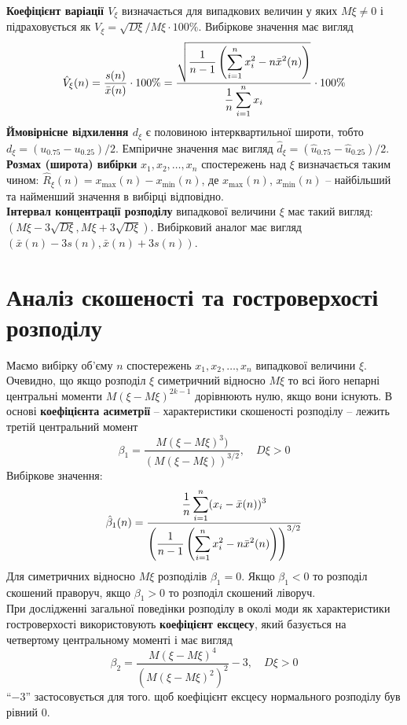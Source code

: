 \textbf{Коефіцієнт варіації $V_\xi$} визначається для випадкових величин у яких $M \xi \ne 0$ і підраховується як $V_\xi = \sqrt{D\xi} / M \xi \cdot 100\%$. Вибіркове значення має вигляд 
\[ \hat{V}_\xi(n) = \dfrac{s(n)}{\bar{x}(n)} \cdot 100\% = \dfrac{\sqrt{\dfrac{1}{n-1} \left(\displaystyle\sum\limits_{i=1}^n x_i^2 - n \bar{x}^2(n)\right)}}{\dfrac{1}{n} \displaystyle\sum\limits_{i=1}^n x_i} \cdot 100\% \]
\textbf{Ймовірнісне відхилення $d_\xi$} є половиною інтерквартильної широти, тобто $d_\xi = (u_{0.75} - u_{0.25}) / 2$. Емпіричне значення має вигляд $\hat{d}_\xi = (\hat{u}_{0.75} - \hat{u}_{0.25}) / 2$. \\

\textbf{Розмах (широта) вибірки} $x_1, x_2, \ldots, x_n$ спостережень над $\xi$ визначається таким чином: $\hat{R}_\xi(n) = x_{\max}(n) - x_{\min}(n)$, де $x_{\max}(n)$, $x_{\min}(n)$ -- найбільший та найменший значення в вибірці відповідно. \\

\textbf{Інтервал концентрації розподілу} випадкової величини $\xi$ має такий вигляд: $(M \xi - 3 \sqrt{D \xi}, M \xi + 3 \sqrt{D \xi})$. Вибірковий аналог має вигляд $(\bar{x}(n) - 3 s(n), \bar{x}(n) + 3 s(n))$.

\section{Аналіз скошеності та гостроверхості розподілу}

Маємо вибірку об'єму $n$ спостережень $x_1, x_2, \ldots, x_n$ випадкової величини $\xi$. \\

Очевидно, що якщо розподіл $\xi$ симетричний відносно $M \xi$ то всі його непарні центральні моменти $M(\xi - M \xi)^{2k-1}$ дорівнюють нулю, якщо вони існують. В основі \textbf{коефіцієнта асиметрії} -- характеристики скошеності розподілу -- лежить третій центральний момент
\[ \beta_1 = \dfrac{M(\xi - M\xi)^3)}{(M(\xi - M \xi))^{3/2}}, \quad D \xi > 0 \]
Вибіркове значення:
\[ \hat{\beta}_1(n) = \dfrac{\dfrac{1}{n} \displaystyle\sum\limits_{i=1}^n(x_i - \bar{x}(n))^3 }{\left( \dfrac{1}{n-1} \left( \displaystyle\sum\limits_{i=1}^n x_i^2 - n \bar{x}^2(n) \right) \right)^{3/2}} \]
Для симетричних відносно $M\xi$ розподілів $\beta_1 = 0$. Якщо $\beta_1 < 0$ то розподіл скошений праворуч, якщо $\beta_1 > 0$ то розподіл скошений ліворуч. \\

При дослідженні загальної поведінки розподілу в околі моди як характеристики гостроверхості використовують \textbf{коефіцієнт ексцесу}, який базується на четвертому центральному моменті і має вигляд
\[ \beta_2 = \dfrac{M (\xi - M \xi)^4}{(M (\xi - M \xi)^2)^2} - 3, \quad D \xi > 0 \]
``$-3$'' застосовується для того. щоб коефіцієнт ексцесу нормального розподілу був рівний 0. \\

